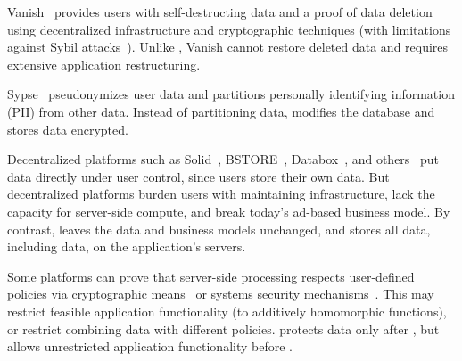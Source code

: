 %
Vanish~\cite{vanish} provides users with self-destructing data and a {proof of
data deletion} using decentralized infrastructure and cryptographic techniques
(with limitations against Sybil attacks~\cite{defeat_vanish}). Unlike
\sys, Vanish cannot restore deleted data and requires extensive application
restructuring.
%

%
{Sypse~\cite{sypse}} pseudonymizes user data and partitions
personally identifying information (PII) from other data. Instead of
partitioning data, \sys modifies the database and stores \xxed data
encrypted.
%

{Decentralized platforms} such as Solid~\cite{solid}, BSTORE~\cite{bstore},
Databox~\cite{databox}, and others~\cite{diy, amber, oort, w5, blockstack} put
data directly under user control, since users store their own data.
%
But decentralized platforms burden users with maintaining infrastructure, lack
the capacity for server-side compute, and break today's ad-based
business model.
%
By contrast, \sys leaves the data and business models unchanged,
and stores all data, including \xxed data, on the application's servers.
%

Some platforms can prove that server-side processing respects
{user-defined policies} via cryptographic means~\cite{zeph} or
systems security mechanisms~\cite{riverbed}. This may restrict feasible
application functionality (\eg to additively homomorphic functions), or restrict
combining data with different policies. \sys protects data only after
\xxing, but allows unrestricted application functionality before
\xxing.

